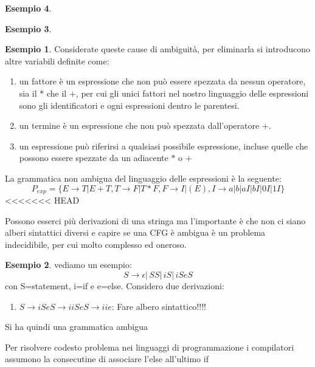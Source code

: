 \documentclass[a4paper]{book}
\theoremstyle{definition}%
\newtheorem*{esempio}{Esempio}
\begin{document}
\begin{esempio}
\begin{esempio}
\begin{esempio}
  Considerate queste cause di ambiguità, per eliminarla si introducono altre variabili definite come:
  \begin{enumerate}
  \item un fattore è un espressione che non può essere spezzata da nessun operatore, sia il $*$ che il $+$, per cui gli unici fattori
    nel nostro linguaggio delle espressioni sono gli identificatori e ogni espressioni dentro le parentesi.
  \item un termine è un espressione che non può spezzata dall'operatore $+$.
  \item un espressione può riferirsi a qualsiasi possibile espressione, incluse quelle che possono essere spezzate da un adiacente $*$ o $+$
  \end{enumerate}
  La grammatica non ambigua del linguaggio delle espressioni è la seguente:
  \begin{equation*}
    P_{exp} = \{E \to T | E + T, T \to F | T * F,F \to I | (E), I \to a | b | aI| bI | 0I | 1I\}
  \end{equation*}
<<<<<<< HEAD
\end{esempio}
Possono esserci più derivazioni di una stringa ma l'importante è che non ci siano alberi sintattici diversi e capire se una CFG è ambigua
è un problema indecidibile, per cui molto complesso ed oneroso.
\begin{esempio}
vediamo un esempio:
\[ S\to \epsilon|\,SS|\, iS|\, iSeS \]
con S=statement, i=if e e=else.
Considero due derivazioni:
\begin{enumerate}
\item $S\to iSeS\to iiSeS\to iie$:
  Fare albero sintattico!!!!
\end{enumerate}
Si ha quindi una grammatica ambigua
\end{esempio}
Per risolvere codesto problema nei linguaggi di programmazione i compilatori assumono la consecutine di associare l'else all'ultimo if 


\end{esempio}
\end{esempio}
\end{document}
